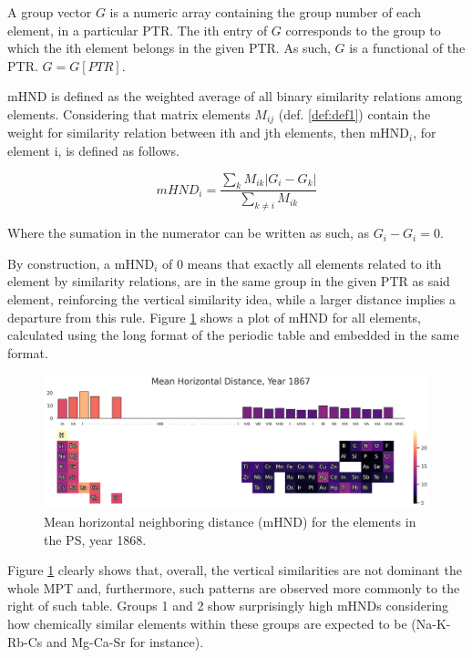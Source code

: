 \documentclass[article]{article}
\begin{document}
\begin{definition}
\label{def:def3}
A group vector $G$ is a numeric array containing the group number of each element, in a particular PTR. The ith entry of $G$ corresponds to the group to which the ith element belongs in the given PTR. As such, $G$ is a functional of the PTR. $G=G[PTR]$.
\end{definition}

\begin{definition}
\label{def:def4}
mHND is defined as the weighted average of all binary similarity relations among elements. Considering that matrix elements $M_{ij}$ (def. \ref{def:def1}) contain the weight for similarity relation between ith and jth elements, then mHND$_i$, for element i, is defined as follows.

	\begin{equation}
		mHND_{i} = \frac{\sum_k M_{ik} | G_i - G_k |}{\sum_{k \neq i} M_{ik}}
	\end{equation}
	
Where the sumation in the numerator can be written as such, as $G_i - G_i = 0$.
\end{definition}

By construction, a mHND$_i$ of 0 means that exactly all elements related to ith element by similarity relations, are in the same group in the given PTR as said element, reinforcing the vertical similarity idea, while a larger distance implies a departure from this rule. Figure \ref{fig:fig3} shows a plot of mHND for all elements, calculated using the long format of the periodic table and embedded in the same format.

\begin{figure}[h!]
  \centering
	\includegraphics[width=18.0cm]{mHND_1868.png}
	\caption{Mean horizontal neighboring distance (mHND) for the elements in the PS, year 1868.}
	\label{fig:fig3}
\end{figure}

Figure \ref{fig:fig3} clearly shows that, overall, the vertical similarities are not dominant the whole MPT and, furthermore, such patterns are observed more commonly to the right of such table. Groups 1 and 2 show surprisingly high mHNDs considering how chemically similar elements within these groups are expected to be (Na-K-Rb-Cs and Mg-Ca-Sr for instance). 
\end{document}
